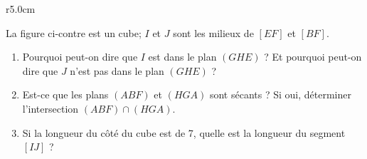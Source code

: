 
\begin{exercice}[\ldots/6]\label{exosmath-0600}

\begin{wrapfigure}{r}{5.0cm}
   \vspace{-0.5cm}        %
   \centering
   
\end{wrapfigure}

La figure ci-contre est un cube; \( I\) et \( J\) sont les milieux de \( [EF]\) et \( [BF]\).
\begin{enumerate}
    \item
        Pourquoi peut-on dire que \( I\) est dans le plan \( (GHE)\) ? Et pourquoi peut-on dire que \( J\) n'est pas dans le plan \( (GHE)\) ?
    \item
        Est-ce que les plans \( (ABF) \) et \( (HGA)\) sont sécants ? Si oui, déterminer l'intersection \( (ABF)\cap (HGA)\).
    \item
        Si la longueur du côté du cube est de \unit{7}{\kilo\meter}, quelle est la longueur du segment \( [IJ]\) ?
\end{enumerate}

\end{exercice}
